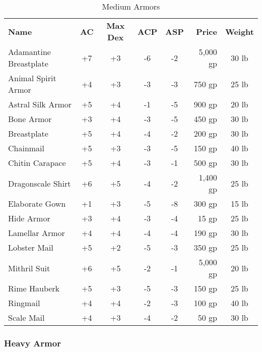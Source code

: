 \begin{table}[htb]
\caption{Medium Armors}
\centering
\begin{tabular}{l *{4}{c} r c}
\textbf{Name} & \textbf{AC} & \textbf{Max Dex} & \textbf{ACP} & \textbf{ASP} & \textbf{Price} & \textbf{Weight}\\
Adamantine Breastplate & +7 & +3 & -6 & -2 & 5,000 gp & 30 lb\\
Animal Spirit Armor & +4 & +3 & -3 & -3 & 750 gp & 25 lb\\
Astral Silk Armor & +5 & +4 & -1 & -5 & 900 gp & 20 lb\\
Bone Armor & +3 & +4 & -3 & -5 & 450 gp & 30 lb\\
Breastplate & +5 & +4 & -4 & -2 & 200 gp & 30 lb\\
Chainmail & +5 & +3 & -3 & -5 & 150 gp & 40 lb\\
Chitin Carapace & +5 & +4 & -3 & -1 & 500 gp & 30 lb\\
Dragonscale Shirt & +6 & +5 & -4 & -2 & 1,400 gp & 25 lb\\
Elaborate Gown & +1 & +3 & -5 & -8 & 300 gp & 15 lb\\
Hide Armor & +3 & +4 & -3 & -4 & 15 gp & 25 lb\\
Lamellar Armor & +4 & +4 & -4 & -4 & 190 gp & 30 lb\\
Lobster Mail & +5 & +2 & -5 & -3 & 350 gp & 25 lb\\
Mithril Suit & +6 & +5 & -2 & -1 & 5,000 gp & 20 lb\\
Rime Hauberk & +5 & +3 & -5 & -3 & 150 gp & 25 lb\\
Ringmail & +4 & +4 & -2 & -3 & 100 gp & 40 lb\\
Scale Mail & +4 & +3 & -4 & -2 & 50 gp & 30 lb\\
\end{tabular}
\end{table}


\subsubsection{Heavy Armor}

